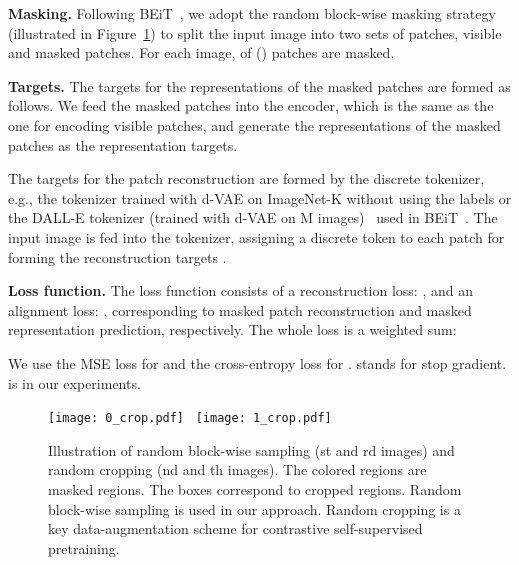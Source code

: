 \documentclass[twocolumn]{svjour3}          \smartqed  \usepackage{graphicx}
\begin{document}
\noindent\textbf{Masking.}
Following BEiT~\cite{bao2021beit}, we adopt the random block-wise masking strategy 
(illustrated in Figure~\ref{fig:maskingandcropping}) to split the input image into two sets of patches,
visible and masked patches. For each image,  of  () patches are masked.

\vspace{1mm}
\noindent\textbf{Targets.}
The targets 
for the representations
of the masked patches
are formed as follows.
We feed the masked patches 
into the encoder,
which is the same as the one for encoding visible patches,
and generate the representations 
of the masked patches
as the representation targets.

The targets 
for the patch reconstruction 
are formed by 
the discrete tokenizer,
e.g.,
the tokenizer trained with d-VAE
on ImageNet-K without using the labels
or the DALL-E tokenizer
(trained with d-VAE on M images)~\cite{RameshPGGVRCS21}
used in BEiT~\cite{bao2021beit}.
The input image is fed into the tokenizer,
assigning a discrete token to each patch
for forming the reconstruction targets .

\vspace{1mm}
\noindent\textbf{Loss function.}
The loss function 
consists of
a reconstruction loss:
,
and an alignment loss:
,
corresponding to masked patch reconstruction and masked representation prediction, respectively.
The whole loss is a weighted sum:

We use the MSE loss for 
and the cross-entropy loss for . 
 stands for stop gradient.
 is  in our experiments.




\begin{figure}[t]
\centering
\texttt{[image: 0\_crop.pdf]}~
\texttt{[image: 1\_crop.pdf]}
\caption{ Illustration
of random block-wise sampling (st and rd images)
and random cropping (nd and th images). The colored regions are masked regions. The boxes correspond to cropped regions.
Random block-wise sampling is used in our approach.
Random cropping
is a key data-augmentation scheme
for contrastive self-supervised pretraining. 
}
\label{fig:maskingandcropping}
\end{figure}
\end{document}
